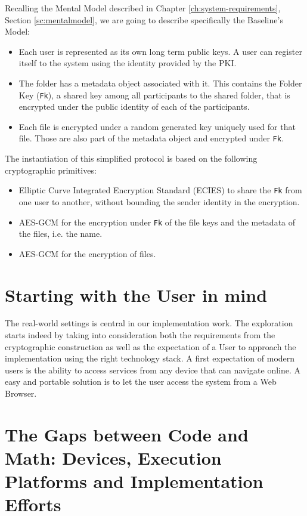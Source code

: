Recalling the Mental Model described in Chapter \cref{ch:system-requirements}, Section \cref{sc:mentalmodel}, 
we are going to describe specifically the Baseline's Model:
\begin{itemize}
    \item Each user is represented as its own long term public keys. A user can register itself to the system using the identity provided by the PKI.
    \item The folder has a metadata object associated with it. This contains the Folder Key (\texttt{Fk}), a shared key among all participants to the shared folder, that is encrypted under the public identity of each of the participants.
    \item Each file is encrypted under a random generated key uniquely used for that file. Those are also part of the metadata object and encrypted under \texttt{Fk}.
\end{itemize}

The instantiation of this simplified protocol is based on the following cryptographic primitives:
\begin{itemize}
    \item Elliptic Curve Integrated Encryption Standard (ECIES) to share the \texttt{Fk} from one user to another, without bounding the sender identity in the encryption.
    \item AES-GCM for the encryption under \texttt{Fk} of the file keys and the metadata of the files, i.e. the name.
    \item AES-GCM for the encryption of files. 
\end{itemize}

\section{Starting with the User in mind} \label{sc:starting-with-the-user}

The real-world settings is central in our implementation work. 
The exploration starts indeed by taking into consideration both the requirements from the cryptographic construction as well as the expectation of a User to approach the implementation using the right technology stack.
A first expectation of modern users is the ability to access services from any device that can navigate online.
A easy and portable solution is to let the user access the system from a Web Browser.

\section{The Gaps between Code and Math: Devices, Execution Platforms and Implementation Efforts}

